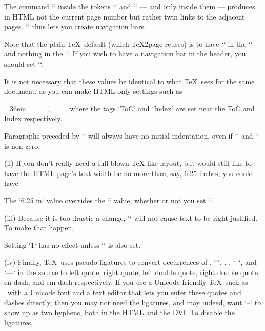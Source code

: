 The command `\folio` inside the tokens `\headline` and `\footline`
— and only inside them —
produces in HTML not the current page number but rather twin links to the
adjacent pages. `\folio` thus lets you create navigation
bars.

Note that the plain \TeX\ default (which
\TeX2page reuses) is to have `\folio` in the
`\footline` and nothing in the `\headline`.  If you wish
to have a navigation bar in the header, you should set
`\headline`.

It is not necessary that these values be
identical to what \TeX\ sees for the same document, as you can
make HTML-only settings such as

%
\begintt
\ifx\shipout\UnDeFiNeD
  \hsize=36em
  \headline={\folio, ~~ , ~~ }
  \footline={\the\headline}  %
\fi
\endtt
%
 where the tags `ToC` and `Index` are set near
the ToC and Index respectively.

%
Paragraphs preceded by `\noindent` will always have no initial
indentation, even if `` and `\parskip` is
non-zero.

%
\item(ii) If you don’t really need a full-blown \TeX-like layout, but would
still like to have the HTML page’s text width be no more than,
say, 6.25 inches, you could have

\begintt
\def\TZPhsize{6.25 in}
\endtt
%
The `\TZPhsize` value overrides the `\hsize` value, whether
or not you set `\TZPtexlayout`.

\item(iii) Because it is too drastic a change, `` will not cause
text to be right-justified.  To make that happen,

\begintt
\let\TZPrightjustify=1
\endtt
%
Setting `\TZPrightjustify` has no effect unless `\TZPtexlayout` is
also set.

\item(iv) Finally, \TeX\ uses pseudo-ligatures to convert
occurrences of , `'`, , , `--`, and `---`
in the source to left quote, right quote, left double quote,
right double quote, en-dash, and em-dash respectively.
If you use a Unicode-friendly \TeX\ such as \XeTeX\ with a Unicode font
and a text editor that lets you enter these quotes and dashes directly,
then you may not need the ligatures, and may indeed, want `--` to
show up as two hyphens, both in the HTML and the DVI.  To
disable the ligatures,

